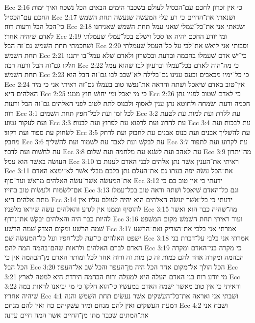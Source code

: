 Ecc 2:16  כי אין זכרון לחכם עם־הכסיל לעולם בשׁכבר הימים הבאים הכל נשׁכח ואיך ימות החכם עם־הכסיל׃
Ecc 2:17  ושׂנאתי את־החיים כי רע עלי המעשׂה שׁנעשׂה תחת השׁמשׁ כי־הכל הבל ורעות רוח׃
Ecc 2:18  ושׂנאתי אני את־כל־עמלי שׁאני עמל תחת השׁמשׁ שׁאניחנו לאדם שׁיהיה אחרי׃
Ecc 2:19  ומי יודע החכם יהיה או סכל וישׁלט בכל־עמלי שׁעמלתי ושׁחכמתי תחת השׁמשׁ גם־זה הבל׃
Ecc 2:20  וסבותי אני ליאשׁ את־לבי על כל־העמל שׁעמלתי תחת השׁמשׁ׃
Ecc 2:21  כי־ישׁ אדם שׁעמלו בחכמה ובדעת ובכשׁרון ולאדם שׁלא עמל־בו יתננו חלקו גם־זה הבל ורעה רבה׃
Ecc 2:22  כי מה־הוה לאדם בכל־עמלו וברעיון לבו שׁהוא עמל תחת השׁמשׁ׃
Ecc 2:23  כי כל־ימיו מכאבים וכעס ענינו גם־בלילה לא־שׁכב לבו גם־זה הבל הוא׃
Ecc 2:24  אין־טוב באדם שׁיאכל ושׁתה והראה את־נפשׁו טוב בעמלו גם־זה ראיתי אני כי מיד האלהים היא׃
Ecc 2:25  כי מי יאכל ומי יחושׁ חוץ ממני׃
Ecc 2:26  כי לאדם שׁטוב לפניו נתן חכמה ודעת ושׂמחה ולחוטא נתן ענין לאסוף ולכנוס לתת לטוב לפני האלהים גם־זה הבל ורעות רוח׃
Ecc 3:1  לכל זמן ועת לכל־חפץ תחת השׁמים׃
Ecc 3:2  עת ללדת ועת למות עת לטעת ועת לעקור נטוע׃
Ecc 3:3  עת להרוג ועת לרפוא עת לפרוץ ועת לבנות׃
Ecc 3:4  עת לבכות ועת לשׂחוק עת ספוד ועת רקוד׃
Ecc 3:5  עת להשׁליך אבנים ועת כנוס אבנים עת לחבוק ועת לרחק מחבק׃
Ecc 3:6  עת לבקשׁ ועת לאבד עת לשׁמור ועת להשׁליך׃
Ecc 3:7  עת לקרוע ועת לתפור עת לחשׁות ועת לדבר׃
Ecc 3:8  עת לאהב ועת לשׂנא עת מלחמה ועת שׁלום׃
Ecc 3:9  מה־יתרון העושׂה באשׁר הוא עמל׃
Ecc 3:10  ראיתי את־הענין אשׁר נתן אלהים לבני האדם לענות בו׃
Ecc 3:11  את־הכל עשׂה יפה בעתו גם את־העלם נתן בלבם מבלי אשׁר לא־ימצא האדם את־המעשׂה אשׁר־עשׂה האלהים מראשׁ ועד־סוף׃
Ecc 3:12  ידעתי כי אין טוב בם כי אם־לשׂמוח ולעשׂות טוב בחייו׃
Ecc 3:13  וגם כל־האדם שׁיאכל ושׁתה וראה טוב בכל־עמלו מתת אלהים היא׃
Ecc 3:14  ידעתי כי כל־אשׁר יעשׂה האלהים הוא יהיה לעולם עליו אין להוסיף וממנו אין לגרע והאלהים עשׂה שׁיראו מלפניו׃
Ecc 3:15  מה־שׁהיה כבר הוא ואשׁר להיות כבר היה והאלהים יבקשׁ את־נרדף׃
Ecc 3:16  ועוד ראיתי תחת השׁמשׁ מקום המשׁפט שׁמה הרשׁע ומקום הצדק שׁמה הרשׁע׃
Ecc 3:17  אמרתי אני בלבי את־הצדיק ואת־הרשׁע ישׁפט האלהים כי־עת לכל־חפץ ועל כל־המעשׂה שׁם׃
Ecc 3:18  אמרתי אני בלבי על־דברת בני האדם לברם האלהים ולראות שׁהם־בהמה המה להם׃
Ecc 3:19  כי מקרה בני־האדם ומקרה הבהמה ומקרה אחד להם כמות זה כן מות זה ורוח אחד לכל ומותר האדם מן־הבהמה אין כי הכל הבל׃
Ecc 3:20  הכל הולך אל־מקום אחד הכל היה מן־העפר והכל שׁב אל־העפר׃
Ecc 3:21  מי יודע רוח בני האדם העלה היא למעלה ורוח הבהמה הירדת היא למטה לארץ׃
Ecc 3:22  וראיתי כי אין טוב מאשׁר ישׂמח האדם במעשׂיו כי־הוא חלקו כי מי יביאנו לראות במה שׁיהיה אחריו׃
Ecc 4:1  ושׁבתי אני ואראה את־כל־העשׁקים אשׁר נעשׂים תחת השׁמשׁ והנה דמעת העשׁקים ואין להם מנחם ומיד עשׁקיהם כח ואין להם מנחם׃
Ecc 4:2  ושׁבח אני את־המתים שׁכבר מתו מן־החיים אשׁר המה חיים עדנה׃
